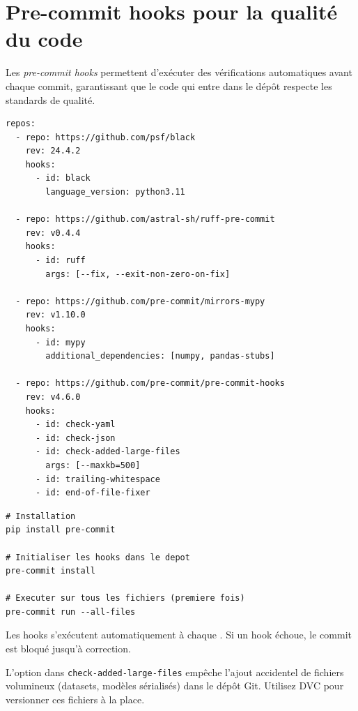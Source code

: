 \section{Pre-commit hooks pour la qualit\'e du code}
\label{sec:pre-commit}

Les \emph{pre-commit hooks} permettent d'ex\'ecuter des v\'erifications automatiques avant chaque commit, garantissant que le code qui entre dans le d\'ep\^ot respecte les standards de qualit\'e.

\begin{codeblock}[title=\textbf{Configuration \file{.pre-commit-config.yaml}}]
\begin{verbatim}
repos:
  - repo: https://github.com/psf/black
    rev: 24.4.2
    hooks:
      - id: black
        language_version: python3.11

  - repo: https://github.com/astral-sh/ruff-pre-commit
    rev: v0.4.4
    hooks:
      - id: ruff
        args: [--fix, --exit-non-zero-on-fix]

  - repo: https://github.com/pre-commit/mirrors-mypy
    rev: v1.10.0
    hooks:
      - id: mypy
        additional_dependencies: [numpy, pandas-stubs]

  - repo: https://github.com/pre-commit/pre-commit-hooks
    rev: v4.6.0
    hooks:
      - id: check-yaml
      - id: check-json
      - id: check-added-large-files
        args: [--maxkb=500]
      - id: trailing-whitespace
      - id: end-of-file-fixer
\end{verbatim}
\end{codeblock}

\begin{bonnepratique}[title=\textbf{Installation et utilisation}]
\begin{verbatim}
# Installation
pip install pre-commit

# Initialiser les hooks dans le depot
pre-commit install

# Executer sur tous les fichiers (premiere fois)
pre-commit run --all-files
\end{verbatim}
Les hooks s'ex\'ecutent automatiquement \`a chaque . Si un hook \'echoue, le commit est bloqu\'e jusqu'\`a correction.
\end{bonnepratique}

\begin{remarque}
L'option  dans \texttt{check-added-large-files} emp\^eche l'ajout accidentel de fichiers volumineux (datasets, mod\`eles s\'erialis\'es) dans le d\'ep\^ot Git. Utilisez DVC pour versionner ces fichiers \`a la place.
\end{remarque}

